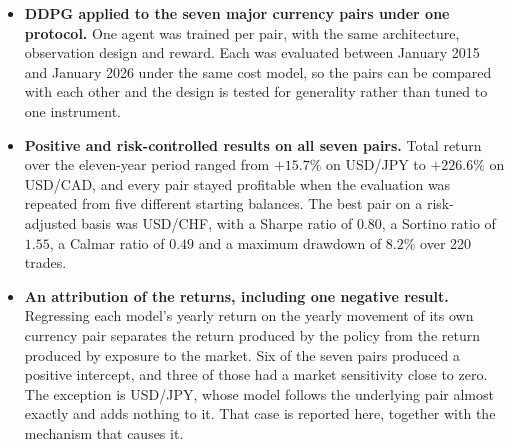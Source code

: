 \begin{itemize}
\item \textbf{DDPG applied to the seven major currency pairs under one protocol.} One agent was trained per pair, with the same architecture, observation design and reward. Each was evaluated between January 2015 and January 2026 under the same cost model, so the pairs can be compared with each other and the design is tested for generality rather than tuned to one instrument.

\item \textbf{Positive and risk-controlled results on all seven pairs.} Total return over the eleven-year period ranged from $+15.7\%$ on USD/JPY to $+226.6\%$ on USD/CAD, and every pair stayed profitable when the evaluation was repeated from five different starting balances. The best pair on a risk-adjusted basis was USD/CHF, with a Sharpe ratio \cite{sharpe_sharpe_1994} of $0.80$, a Sortino ratio \cite{sortino_performance_1994} of $1.55$, a Calmar ratio \cite{bacon_practical_2023} of $0.49$ and a maximum drawdown of $8.2\%$ over 220 trades.

\item \textbf{An attribution of the returns, including one negative result.} Regressing each model's yearly return on the yearly movement of its own currency pair separates the return produced by the policy from the return produced by exposure to the market. Six of the seven pairs produced a positive intercept, and three of those had a market sensitivity close to zero. The exception is USD/JPY, whose model follows the underlying pair almost exactly and adds nothing to it. That case is reported here, together with the mechanism that causes it.
\end{itemize}